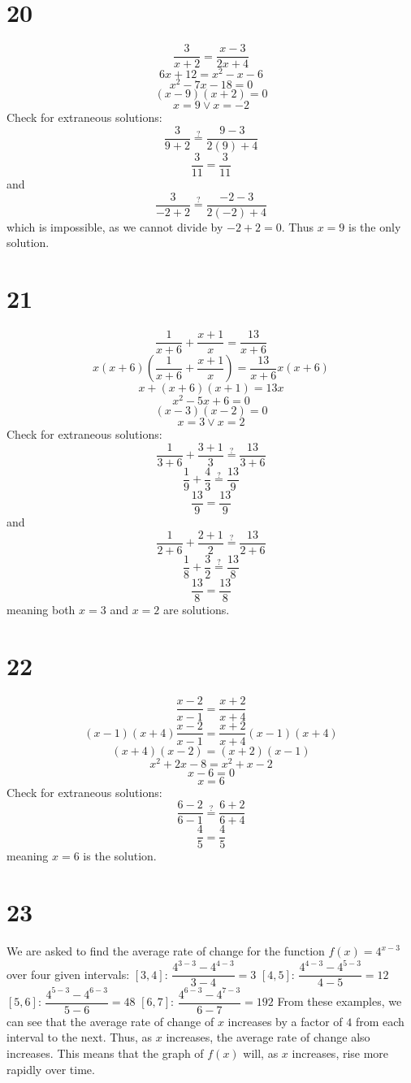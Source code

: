 \documentclass{article}
\theoremstyle{definition}
\newcommand{\?}{\stackrel{?}{=}}
\begin{document}
\section*{20}
\[ \frac{3}{x+2}=\frac{x-3}{2x+4} \]
\[ 6x+12=x^2-x-6 \] \[ x^2-7x-18=0 \] \[ (x-9)(x+2)=0 \] \[ x=9\vee x=-2 \]
Check for extraneous solutions:
\[ \frac{3}{9+2}\?\frac{9-3}{2(9)+4} \] \[ \frac{3}{11}=\frac{3}{11} \]
and \[ \frac{3}{-2+2}\?\frac{-2-3}{2(-2)+4} \] which is impossible, as we cannot divide by $-2+2=0$. Thus $x=9$ is the only solution.

\section*{21}
\[ \frac{1}{x+6}+\frac{x+1}{x}=\frac{13}{x+6} \]
\[ x(x+6)(\frac{1}{x+6}+\frac{x+1}{x})=\frac{13}{x+6}x(x+6) \]
\[ x+(x+6)(x+1)=13x \] \[ x^2-5x+6=0 \] \[ (x-3)(x-2)=0 \] \[ x=3\vee x=2 \]
Check for extraneous solutions:
\[ \frac{1}{3+6}+\frac{3+1}{3}\?\frac{13}{3+6} \] \[ \frac{1}{9}+\frac{4}{3}\?\frac{13}{9} \] \[ \frac{13}{9}=\frac{13}{9} \]
and \[ \frac{1}{2+6}+\frac{2+1}{2}\?\frac{13}{2+6} \] \[ \frac{1}{8}+\frac{3}{2}\?\frac{13}{8} \] \[ \frac{13}{8}=\frac{13}{8} \]
meaning both $x=3$ and $x=2$ are solutions.

\section*{22}
\[ \frac{x-2}{x-1}=\frac{x+2}{x+4} \] \[ (x-1)(x+4)\frac{x-2}{x-1}=\frac{x+2}{x+4}(x-1)(x+4) \]
\[ (x+4)(x-2)=(x+2)(x-1) \] \[ x^2+2x-8=x^2+x-2 \] \[ x-6=0 \] \[ x=6 \]
Check for extraneous solutions:
\[ \frac{6-2}{6-1}\?\frac{6+2}{6+4} \] \[ \frac{4}{5}=\frac{4}{5} \]
meaning $x=6$ is the solution.

\section*{23}
We are asked to find the average rate of change for the function $f(x)=4^{x-3}$ over four given intervals:\newline
$[3,4]$: $\dfrac{4^{3-3}-4^{4-3}}{3-4}=3$\newline
$[4,5]$: $\dfrac{4^{4-3}-4^{5-3}}{4-5}=12$\newline
$[5,6]$: $\dfrac{4^{5-3}-4^{6-3}}{5-6}=48$\newline
$[6,7]$: $\dfrac{4^{6-3}-4^{7-3}}{6-7}=192$\newline
From these examples, we can see that the average rate of change of $x$ increases by a factor of $4$ from each interval to the next. Thus, as $x$ increases, the 
average rate of change also increases. This means that the graph of $f(x)$ will, as $x$ increases, rise more rapidly over time.
\end{document}
